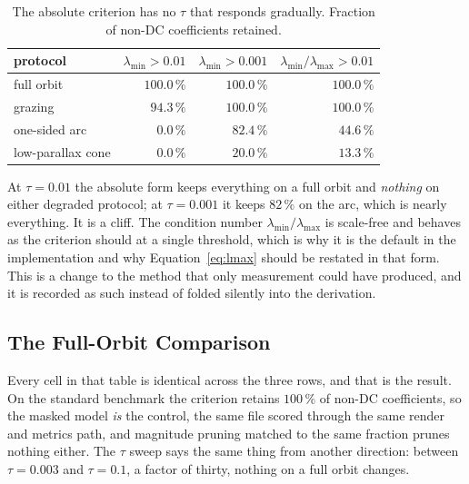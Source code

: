 \begin{table}[htbp]
  \centering
  \caption{The absolute criterion has no $\tau$ that responds gradually. Fraction
  of non-DC coefficients retained.}
  \label{tab:b2abs}
  \small
  \begin{tabular}{lrrr}
    \toprule
    protocol & $\lambda_{\min} > 0.01$ & $\lambda_{\min} > 0.001$ & $\lambda_{\min}/\lambda_{\max} > 0.01$ \\
    \midrule
    full orbit        & $100.0\,\%$ & $100.0\,\%$ & $100.0\,\%$ \\
    grazing           & $94.3\,\%$  & $100.0\,\%$ & $100.0\,\%$ \\
    one-sided arc     & $0.0\,\%$   & $82.4\,\%$  & $44.6\,\%$ \\
    low-parallax cone & $0.0\,\%$   & $20.0\,\%$  & $13.3\,\%$ \\
    \bottomrule
  \end{tabular}
\end{table}

At $\tau = 0.01$ the absolute form keeps everything on a full orbit and
\emph{nothing} on either degraded protocol; at $\tau = 0.001$ it keeps $82\,\%$
on the arc, which is nearly everything. It is a cliff.
The condition number $\lambda_{\min}/\lambda_{\max}$ is scale-free and behaves as
the criterion should at a single threshold, which is why it is the default in the
implementation and why Equation~\eqref{eq:lmax} should be restated in that form.
This is a change to the method that only measurement could have produced, and it is recorded as such instead of folded silently into the derivation.

\subsection*{The Full-Orbit Comparison}



Every cell in that table is identical across the three rows, and that is the result. On the standard benchmark the
criterion retains $100\,\%$ of non-DC coefficients, so the masked model \emph{is} the control, the same file scored through the same
render and metrics path, and magnitude pruning matched to the same fraction
prunes nothing either. The $\tau$ sweep says the same thing from another direction:
between $\tau = 0.003$ and $\tau = 0.1$, a factor of thirty, nothing on a full
orbit changes.


